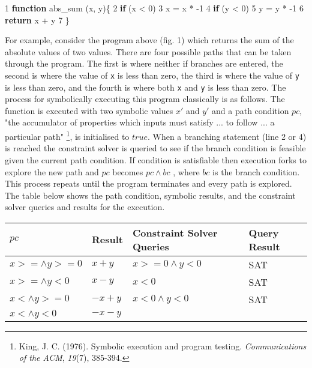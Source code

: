\documentclass[]{article}
\newenvironment{Shaded}{}{}
\newcommand{\AttributeTok}[1]{\textcolor[rgb]{0.49,0.56,0.16}{#1}}
\newcommand{\ControlFlowTok}[1]{\textcolor[rgb]{0.00,0.44,0.13}{\textbf{#1}}}
\newcommand{\DecValTok}[1]{\textcolor[rgb]{0.25,0.63,0.44}{#1}}
\newcommand{\KeywordTok}[1]{\textcolor[rgb]{0.00,0.44,0.13}{\textbf{#1}}}
\newcommand{\NormalTok}[1]{#1}
\newcommand{\OperatorTok}[1]{\textcolor[rgb]{0.40,0.40,0.40}{#1}}
\begin{document}
\begin{Shaded}
\begin{Highlighting}[]
\DecValTok{1} \KeywordTok{function} \AttributeTok{abs_sum}\NormalTok{ (x}\OperatorTok{,}\NormalTok{ y)}\OperatorTok{\{}
\DecValTok{2}  \ControlFlowTok{if}\NormalTok{ (x }\OperatorTok{<} \DecValTok{0}\NormalTok{)}
\DecValTok{3}\NormalTok{    x }\OperatorTok{=}\NormalTok{ x }\OperatorTok{*} \DecValTok{-1}
\DecValTok{4}  \ControlFlowTok{if}\NormalTok{ (y }\OperatorTok{<} \DecValTok{0}\NormalTok{)}
\DecValTok{5}\NormalTok{    y }\OperatorTok{=}\NormalTok{ y }\OperatorTok{*} \DecValTok{-1}
\DecValTok{6}  \ControlFlowTok{return}\NormalTok{ x }\OperatorTok{+}\NormalTok{ y}
\DecValTok{7} \OperatorTok{\}}
\end{Highlighting}
\end{Shaded}

For example, consider the program above (fig. 1) which returns the sum
of the absolute values of two values. There are four possible paths that
can be taken through the program. The first is where neither if branches
are entered, the second is where the value of \texttt{x} is less than
zero, the third is where the value of \texttt{y} is less than zero, and
the fourth is where both \texttt{x} and \texttt{y} is less than zero.
The process for symbolically executing this program classically is as
follows. The function is executed with two symbolic values \(x'\) and
\(y'\) and a path condition \(pc\), "the accumulator of properties which
inputs must satisfy ... to follow ... a particular path" \footnote{King,
  J. C. (1976). Symbolic execution and program testing.
  \emph{Communications of the ACM}, \emph{19}(7), 385-394.}, is
initialised to \(true\). When a branching statement (line 2 or 4) is
reached the constraint solver is queried to see if the branch condition
is feasible given the current path condition. If condition is
satisfiable then execution forks to explore the new path and \(pc\)
becomes \(pc \land bc\) , where \(bc\) is the branch condition. This
process repeats until the program terminates and every path is explored.
The table below shows the path condition, symbolic results, and the
constraint solver queries and results for the execution.

\begin{longtable}[]{@{}llll@{}}
\toprule
\(pc\) & Result & Constraint Solver Queries & Query
Result\tabularnewline
\midrule
\endhead
\(x >= \land y >= 0\) & \(x+y\) & \(x >=0 \land y < 0 \) &
SAT\tabularnewline
\(x >= \land y < 0\) & \(x - y\) & \(x <0 \) & SAT\tabularnewline
\(x < \land y >= 0\) & \(-x+y\) & \(x<0 \land y < 0 \) &
SAT\tabularnewline
\(x < \land y < 0\) & \(-x-y\) & &\tabularnewline
\bottomrule
\end{longtable}
\end{document}
